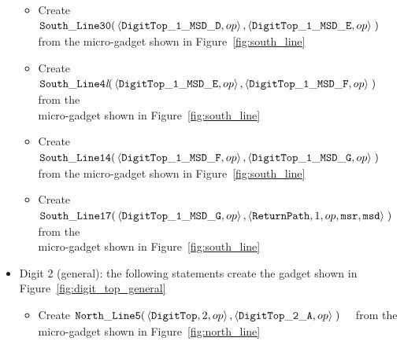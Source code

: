 \begin{itemize}
\begin{itemize}
            \item Create
            $\begin{aligned}[t]
                {\tt South\_Line30}(& \left\langle {\tt DigitTop\_1\_MSD\_D}, op \right\rangle,
                                      \left\langle {\tt DigitTop\_1\_MSD\_E}, op \right\rangle \;)
            \end{aligned}$ from the micro-gadget shown in Figure~\ref{fig:south_line}

            \item Create
            $\begin{aligned}[t]
                {\tt South\_Line4\textit{l}}(& \left\langle {\tt DigitTop\_1\_MSD\_E}, op \right\rangle,
                                               \left\langle {\tt DigitTop\_1\_MSD\_F}, op \right\rangle \;)
            \end{aligned}$ from the\\micro-gadget shown in Figure~\ref{fig:south_line}

            \item Create
            $\begin{aligned}[t]
                {\tt South\_Line14}(& \left\langle {\tt DigitTop\_1\_MSD\_F}, op \right\rangle,
                                      \left\langle {\tt DigitTop\_1\_MSD\_G}, op \right\rangle \;)
            \end{aligned}$ from the micro-gadget shown in Figure~\ref{fig:south_line}

            \item Create
            $\begin{aligned}[t]
                {\tt South\_Line17}(& \left\langle {\tt DigitTop\_1\_MSD\_G}, op                       \right\rangle,
                                      \left\langle {\tt ReturnPath}, 1,            op, {\tt msr}, {\tt msd} \right\rangle \;)
            \end{aligned}$ from the\\micro-gadget shown in Figure~\ref{fig:south_line}
        \end{itemize}
        \vspace{1cm}


        \item Digit 2 (general): the following statements create the gadget shown in Figure~\ref{fig:digit_top_general}
        \begin{itemize}
            \item Create
            $\begin{aligned}[t]
                {\tt North\_Line5}(& \left\langle {\tt DigitTop}, 2,    op \right\rangle,
                                     \left\langle {\tt DigitTop\_2\_A}, op \right\rangle \;)
            \end{aligned}$ from the micro-gadget shown in Figure~\ref{fig:north_line}


\end{itemize}
\end{itemize}
